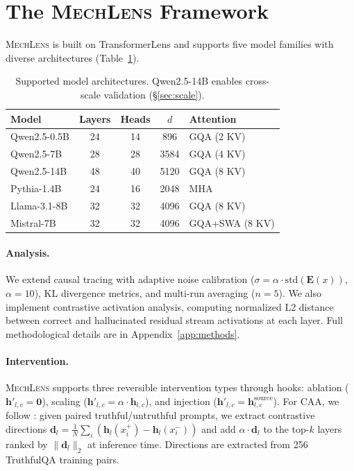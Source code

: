 \documentclass{article}
\newcommand{\mechlens}{\textsc{MechLens}}
\newcommand{\caa}{\textsc{CAA}}
\begin{document}
\section{The \mechlens{} Framework}
\label{sec:framework}

\mechlens{} is built on TransformerLens \citep{nanda2022transformerlens} and supports five model families with diverse architectures (Table~\ref{tab:models}).

\begin{table}[t]
\centering
\small
\begin{tabular}{lcccl}
\toprule
\textbf{Model} & \textbf{Layers} & \textbf{Heads} & \textbf{$d$} & \textbf{Attention} \\
\midrule
Qwen2.5-0.5B & 24 & 14 & 896 & GQA (2 KV) \\
Qwen2.5-7B & 28 & 28 & 3584 & GQA (4 KV) \\
Qwen2.5-14B & 48 & 40 & 5120 & GQA (8 KV) \\
Pythia-1.4B & 24 & 16 & 2048 & MHA \\
Llama-3.1-8B & 32 & 32 & 4096 & GQA (8 KV) \\
Mistral-7B & 32 & 32 & 4096 & GQA+SWA (8 KV) \\
\bottomrule
\end{tabular}
\caption{Supported model architectures. Qwen2.5-14B enables cross-scale validation (\S\ref{sec:scale}).}
\label{tab:models}
\end{table}

\paragraph{Analysis.} We extend causal tracing \citep{meng2022locating} with adaptive noise calibration ($\sigma = \alpha \cdot \text{std}(\mathbf{E}(x))$, $\alpha{=}10$), KL divergence metrics, and multi-run averaging ($n{=}5$). We also implement contrastive activation analysis, computing normalized L2 distance between correct and hallucinated residual stream activations at each layer. Full methodological details are in Appendix~\ref{app:methods}.

\paragraph{Intervention.} \mechlens{} supports three reversible intervention types through hooks: ablation ($\mathbf{h}'_{l,c} = \mathbf{0}$), scaling ($\mathbf{h}'_{l,c} = \alpha \cdot \mathbf{h}_{l,c}$), and injection ($\mathbf{h}'_{l,c} = \mathbf{h}^{\text{source}}_{l,c}$). For \caa{}, we follow \citet{turner2023activation}: given paired truthful/untruthful prompts, we extract contrastive directions $\mathbf{d}_l = \frac{1}{N}\sum_i(\mathbf{h}_l(x^+_i) - \mathbf{h}_l(x^-_i))$ and add $\alpha \cdot \mathbf{d}_l$ to the top-$k$ layers ranked by $\|\mathbf{d}_l\|_2$ at inference time. Directions are extracted from 256 TruthfulQA training pairs.
\end{document}
